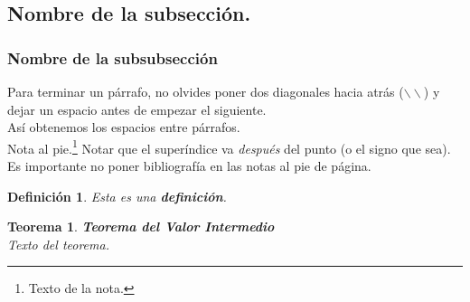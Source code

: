 \documentclass[spanish,twoside,utf8]{book}
\newtheorem{theorem}{Teorema}
\newtheorem{definition}{Definición}
\begin{document}
\subsection*{Nombre de la subsecci\'on.}

\subsubsection*{Nombre de la subsubsecci\'on}






Para terminar un p\'arrafo, no olvides poner dos diagonales hacia atr\'as ($\backslash \backslash$) y dejar un espacio antes de empezar el siguiente.\\

As\'i obtenemos los espacios entre p\'arrafos.\\




Nota al pie.\footnote{Texto de la nota.} Notar que el superíndice va \textit{después} del punto (o el signo que sea). Es importante no poner bibliografía en las notas al pie de p\'agina.\\




\begin{definition}
Esta es una \textbf{definici\'on}. 
\end{definition}

\begin{theorem} %
\textbf{Teorema del Valor Intermedio}\\
Texto del teorema.%
\end{theorem} %
\end{document}

